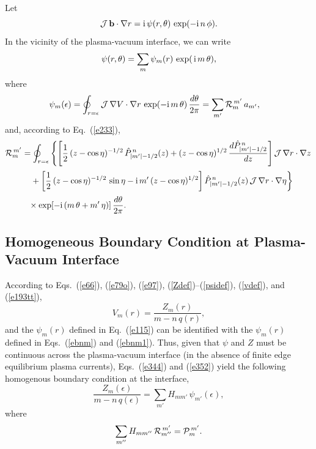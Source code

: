 \documentclass[12pt,prb,aps]{revtex4-1}
\begin{document}
Let
\begin{equation}\label{ebnm}
{\cal J}\,{\bf b}\cdot\nabla r = {\rm i}\,\psi(r,\theta)\,\exp(-{\rm i}\,n\,\phi).
\end{equation}
In the vicinity of the plasma-vacuum interface, we can write
\begin{equation}\label{ebnm1}
\psi(r,\theta) = \sum_m \psi_m(r)\,\exp(\,{\rm i}\,m\,\theta),
\end{equation}
where
\begin{align}\label{e352}
\psi_m(\epsilon)&= \oint_{r=\epsilon}{\cal J}\,\nabla V\cdot \nabla r\,\exp(-{\rm i}\,m\,\theta)\,\frac{d\theta}{2\pi}= \sum_{m'}{\cal R}_m^{\,m'}\,a_{m'},
\end{align}
and,  according to Eq.~(\ref{e233}), 
\begin{align}\label{e354}
{\cal R}_m^{\,m'} &=\oint_{r=\epsilon}
\left\{\left[\frac{1}{2}\,(z-\cos\eta)^{-1/2}\,\hat{P}_{|m'|-1/2}^{\,n}(z)+(z-\cos\eta)^{1/2}\,\frac{d\hat{P}_{|m'|-1/2}^{\,n}}{dz}\right]{\cal J}\,\nabla r\cdot \nabla z
\right.\nonumber\\[0.5ex]&
\left.\phantom{=}+\left[\frac{1}{2}\,(z-\cos\eta)^{-1/2}\,\sin\eta-{\rm i}\,m'\,(z-\cos\eta)^{1/2}\right]\hat{P}_{|m'|-1/2}^{\,n}(z)\,{\cal J}\,\nabla r\cdot \nabla \eta
\right\}\nonumber\\[0.5ex] &
\phantom{=}\times\exp[-{\rm i}\,(m\,\theta+m'\,\eta)]\,\frac{d\theta}{2\pi}.
\end{align}

\subsection{Homogeneous Boundary Condition at Plasma-Vacuum Interface}
According to Eqs.~(\ref{e66}), (\ref{e79o}), (\ref{e97}), (\ref{Zdef})--(\ref{psidef}),  (\ref{vdef}), and (\ref{e193tt}), 
\begin{equation}\label{evdef}
V_m(r)= \frac{Z_m(r)}{m-n\,q(r)},
\end{equation}
and the $\psi_m(r)$ defined in Eq.~(\ref{e115}) can be identified with the $\psi_m(r)$ defined in Eqs.~(\ref{ebnm}) and (\ref{ebnm1}). 
Thus, given that $\psi$ and $Z$ must be continuous across the plasma-vacuum interface (in the absence of finite
edge equilibrium plasma currents), Eqs.~(\ref{e344}) and (\ref{e352}) yield the following homogenous boundary condition at the  interface,
\begin{equation}\label{bc}
\frac{Z_m(\epsilon)}{m-n\,q(\epsilon)} = \sum_{m'} H_{mm'}\,\psi_{m'}(\epsilon),
\end{equation}
where
\begin{equation}\label{ehdef}
\sum_{m''}H_{mm''}\,{\cal R}_{m''}^{\,m'} = {\cal P}_m^{\,m'}.
\end{equation}
\end{document}
